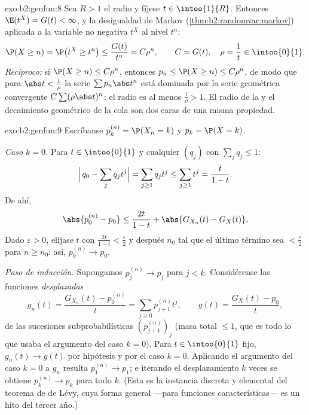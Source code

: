 \begin{solution}{exo:b2:genfun:8}
Sea $R > 1$ el radio y fíjese $t \in \intoo{1}{R}$. Entonces
$\E(t^X) = G(t) < \infty$, y la desigualdad de Markov
(\cref{thm:b2:randomvar:markov}) aplicada a la variable no negativa
$t^X$ al nivel $t^n$:
\[
\P(X \geq n) = \P\bigl(t^X \geq t^n\bigr)
\leq \frac{G(t)}{t^n} = C\rho^n,
\qquad C = G(t),\quad \rho = \frac1t \in \intoo{0}{1}.
\]
\emph{Recíproco:} si $\P(X \geq n) \leq C\rho^n$, entonces $p_n \leq
\P(X \geq n) \leq C\rho^n$, de modo que para $\abs t < \frac1\rho$ la
serie $\sum p_n\abs t^n$ está dominada por la serie geométrica
convergente $C\sum(\rho\abs t)^n$: el radio es al menos
$\frac1\rho > 1$. El radio de la  y el decaimiento
geométrico de la cola son dos caras de una misma propiedad.
\end{solution}

\begin{solution}{exo:b2:genfun:9}
Escríbanse $p_k^{(n)} = \P(X_n = k)$ y $p_k = \P(X = k)$.

\emph{Caso $k = 0$.} Para $t \in \intoo{0}{1}$ y cualquier 
$(q_j)$ con $\sum_j q_j \leq 1$:
\[
\Bigl|\,q_0 - \sum_j q_jt^j\Bigr|
= \sum_{j \geq 1} q_j t^j
\leq \sum_{j\geq1}t^j = \frac{t}{1 - t} .
\]
De ahí,
\[
\abs{p_0^{(n)} - p_0}
\leq \frac{2t}{1 - t}
+ \abs{G_{X_n}(t) - G_X(t)} .
\]
Dado $\varepsilon > 0$, elíjase $t$ con $\frac{2t}{1-t} <
\frac\varepsilon2$ y después $n_0$ tal que el último término sea $<
\frac\varepsilon2$ para $n \geq n_0$: así, $p_0^{(n)} \to p_0$.

\emph{Paso de inducción.} Supongamos $p_j^{(n)} \to p_j$ para $j <
k$. Considérense las funciones \emph{desplazadas}
\[
g_n(t) = \frac{G_{X_n}(t) - p^{(n)}_0}{t}
= \sum_{j\geq0} p^{(n)}_{j+1}t^j,
\qquad
g(t) = \frac{G_X(t) - p_0}{t} ,
\]
 de las sucesiones subprobabilísticas
$(p^{(n)}_{j+1})_j$ (masa total $\leq 1$, que es todo lo que usaba el
argumento del caso $k = 0$). Para $t \in \intoo{0}{1}$ fijo, $g_n(t)
\to g(t)$ por hipótesis y por el caso $k = 0$. Aplicando el argumento
del caso $k = 0$ a $g_n$ resulta $p_1^{(n)} \to p_1$; e iterando el
desplazamiento $k$ veces se obtiene $p_k^{(n)} \to p_k$ para todo
$k$. (Esta es la instancia discreta y elemental del teorema de
 de Lévy, cuya forma general ---para funciones
características--- es un hito del tercer año.)
\end{solution}

